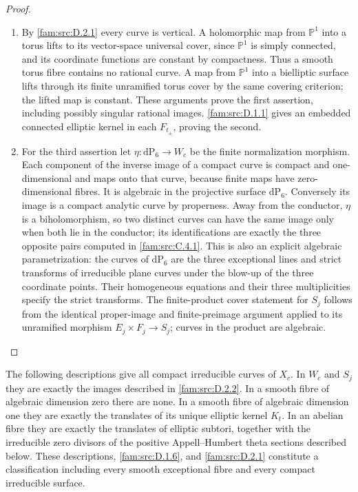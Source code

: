 \begin{proof}
\begin{enumerate}[label=\arabic*.,leftmargin=*]
\item By \ref{fam:src:D.2.1} every curve is vertical. A holomorphic map from
\(\mathbb P^1\) into a torus lifts to its vector-space universal cover,
since \(\mathbb P^1\) is simply connected, and its coordinate functions
are constant by compactness. Thus a smooth torus fibre contains no
rational curve. A map from \(\mathbb P^1\) into a bielliptic surface
lifts through its finite unramified torus cover by the same covering
criterion; the lifted map is constant. These arguments prove the first
assertion, including possibly singular rational images.
\ref{fam:src:D.1.1} gives an embedded connected elliptic kernel in each \(F_{t_\pm}\),
proving the second.

\item For the third assertion let \(\eta:\mathrm{dP}_6\to W_c\) be the finite
normalization morphism. Each component of the inverse image of a compact
curve is compact and one-dimensional and maps onto that curve, because
finite maps have zero-dimensional fibres. It is algebraic in the
projective surface \(\mathrm{dP}_6\). Conversely its image is a compact
analytic curve by properness. Away from the conductor, \(\eta\) is a
biholomorphism, so two distinct curves can have the same image only when
both lie in the conductor; its identifications are exactly the three
opposite pairs computed in \ref{fam:src:C.4.1}. This is also an explicit algebraic
parametrization: the curves of \(\mathrm{dP}_6\) are the three exceptional
lines and strict transforms of irreducible plane curves under the blow-up
of the three coordinate points. Their homogeneous equations and their
three multiplicities specify the strict transforms. The finite-product
cover statement for \(S_j\) follows from the identical proper-image and
finite-preimage argument applied to its unramified morphism
\(E_j\times F_j\to S_j\); curves in the product are algebraic.
\end{enumerate}
\end{proof}

\begin{theorem}\hypertarget{tag-01R0}{}\label{fam:src:D.2.3}\label{fam:st:D.2.3}

The following descriptions give all compact irreducible curves of $X_c$.
In $W_c$ and $S_j$ they are exactly the images described in \ref{fam:src:D.2.2}.
In a smooth fibre of algebraic dimension zero there are none. In a
smooth fibre of algebraic dimension one they are exactly the translates
of its unique elliptic kernel $K_t$. In an abelian fibre they are exactly
the translates of elliptic subtori, together with the irreducible zero
divisors of the positive Appell--Humbert theta sections described below.
These descriptions, \ref{fam:src:D.1.6}, and \ref{fam:src:D.2.1} constitute a classification including
every smooth exceptional fibre and every compact irreducible surface.
\end{theorem}

